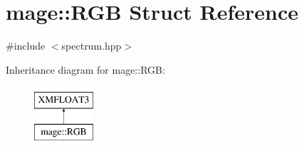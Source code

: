 \hypertarget{structmage_1_1_r_g_b}{}\section{mage\+:\+:R\+GB Struct Reference}
\label{structmage_1_1_r_g_b}


{\ttfamily \#include $<$spectrum.\+hpp$>$}

Inheritance diagram for mage\+:\+:R\+GB\+:\begin{figure}[H]
\begin{center}
\leavevmode
\includegraphics[height=2.000000cm]{structmage_1_1_r_g_b}
\end{center}
\end{figure}
